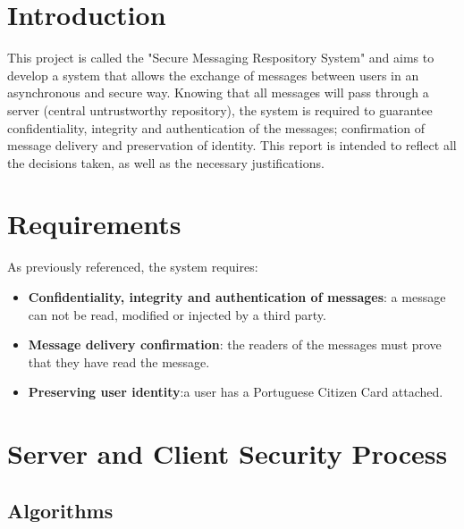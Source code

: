 \documentclass[pdftex,12pt,a4paper]{report}
\begin{document}
\renewcommand{\headrulewidth}{0pt}

\fancyhead{}
\fancyfoot{}
\rfoot{\thepage}

\renewcommand*\contentsname{Conteúdos}
\renewcommand*\figurename{Figura}
\renewcommand*\tablename{Tabela}

\tableofcontents

\renewcommand{\thechapter}{}

\clearpage

\section{Introduction}

This project is called the "Secure Messaging Respository System" and aims to develop a system that allows the exchange of messages between users in an asynchronous and secure way. Knowing that all messages will pass through a server (central untrustworthy repository), the system is required to guarantee confidentiality, integrity and authentication of the messages; confirmation of message delivery and preservation of identity. This report is intended to reflect all the decisions taken, as well as the necessary justifications.

\newpage
\section{Requirements}

As previously referenced, the system requires:

\begin{itemize}
\item \textbf{Confidentiality, integrity and authentication of messages}: a message can not be read, modified or injected by a third party.
\item \textbf{Message delivery confirmation}: the readers of the messages must prove that they have read the message.
\item \textbf{Preserving user identity}:a user has a Portuguese Citizen Card attached.
\end{itemize}

\newpage
\section{Server and Client Security Process}

\subsection{Algorithms}
\end{document}
